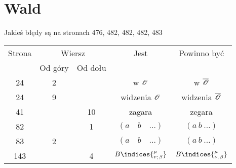 \documentclass[a4paper,11pt]{article}
\numberwithin{equation}{section}
\begin{document}
\VerSpaceSix









\section{Wald}

\label{sec:Uwagi-ogolne}



Jakieś błędy są na stronach 476, 482, 482, 482, 483



\newpage



\begin{center}

  \begin{tabular}{|c|c|c|c|c|}
    \hline
    Strona & \multicolumn{2}{c|}{Wiersz} & Jest
                              & Powinno być \\ \cline{2-3}
    & Od góry & Od dołu & & \\
    \hline
    24 & 2 & & w $\mathcal{O}$ & w $\overline{ \mathcal{O} }$ \\
    24 & 9 & & widzenia $\mathcal{O}$ & widzenia $\overline{ \mathcal{O} }$ \\
    41 & & 10 & zagara & zegara \\
    82 & & 1 & $( a \quad b \quad \ldots )$ & $( a \: b \: \ldots )$ \\
    83 & 2 & & $( a \quad b \quad \ldots )$ & $( a \: b \: \ldots )$ \\
    143 & & 4 & $B\indices{^\mu_{ v ; \, \beta }}$ & $B\indices{ ^\mu_{ \nu, \, \beta } }$ \\
    \hline
  \end{tabular}

\end{center}

\VerSpaceSix











\end{document}
